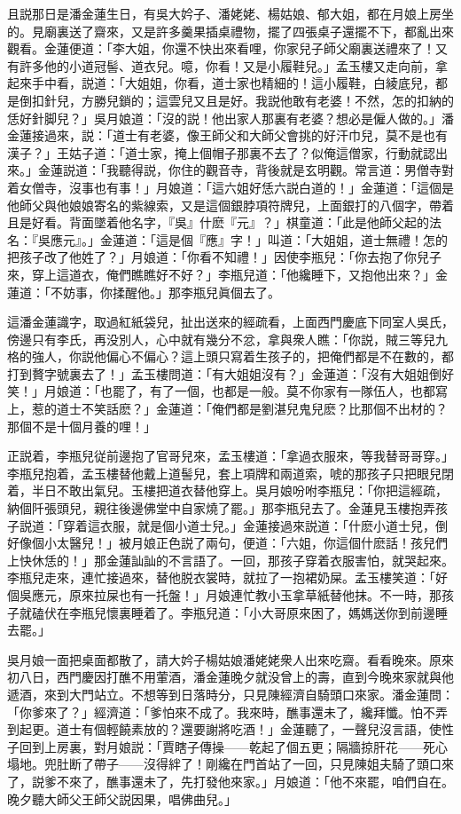 且説那日是潘金蓮生日，有吳大妗子、潘姥姥、楊姑娘、郁大姐，都在月娘上房坐的。見廟裏送了齋來，又是許多羹果插桌禮物，擺了四張桌子還擺不下，都亂出來觀看。金蓮便道：「李大姐，你還不快出來看哩，你家兒子師父廟裏送禮來了！又有許多他的小道冠髻、道衣兒。噫，你看！又是小履鞋兒。」孟玉樓又走向前，拿起來手中看，説道：「大姐姐，你看，道士家也精細的！這小履鞋，白綾底兒，都是倒扣針兒，方勝兒鎖的；這雲兒又且是好。我説他敢有老婆！不然，怎的扣納的恁好針脚兒？」吳月娘道：「沒的説！他出家人那裏有老婆？想必是僱人做的。」潘金蓮接過來，説：「道士有老婆，像王師父和大師父會挑的好汗巾兒，莫不是也有漢子？」王姑子道：「道士家，掩上個帽子那裏不去了？似俺這僧家，行動就認出來。」金蓮説道：「我聽得説，你住的觀音寺，背後就是玄明觀。常言道：男僧寺對着女僧寺，沒事也有事！」月娘道：「這六姐好恁六説白道的！」金蓮道：「這個是他師父與他娘娘寄名的紫線索，又是這個銀脖項符牌兒，上面銀打的八個字，帶着且是好看。背面墜着他名字，『吳』什麽『元』？」棋童道：「此是他師父起的法名：『吳應元』。」金蓮道：「這是個『應』字！」叫道：「大姐姐，道士無禮！怎的把孩子改了他姓了？」月娘道：「你看不知禮！」因使李瓶兒：「你去抱了你兒子來，穿上這道衣，俺們瞧瞧好不好？」李瓶兒道：「他纔睡下，又抱他出來？」金蓮道：「不妨事，你揉醒他。」那李瓶兒眞個去了。

這潘金蓮識字，取過紅紙袋兒，扯出送來的經疏看，上面西門慶底下同室人吳氏，傍邊只有李氏，再没別人，心中就有幾分不忿，拿與衆人瞧：「你説，賊三等兒九格的強人，你説他偏心不偏心？這上頭只寫着生孩子的，把俺們都是不在數的，都打到贅字號裏去了！」孟玉樓問道：「有大姐姐沒有？」金蓮道：「沒有大姐姐倒好笑！」月娘道：「也罷了，有了一個，也都是一般。莫不你家有一隊伍人，也都寫上，惹的道士不笑話麽？」金蓮道：「俺們都是劉湛兒鬼兒麽？比那個不出材的？那個不是十個月養的哩！」

正説着，李瓶兒従前邊抱了官哥兒來，孟玉樓道：「拿過衣服來，等我替哥哥穿。」李瓶兒抱着，孟玉樓替他戴上道髻兒，套上項牌和兩道索，唬的那孩子只把眼兒閉着，半日不敢出氣兒。玉樓把道衣替他穿上。吳月娘吩咐李瓶兒：「你把這經疏，納個阡張頭兒，親往後邊佛堂中自家燒了罷。」那李瓶兒去了。金蓮見玉樓抱弄孩子説道：「穿着這衣服，就是個小道士兒。」金蓮接過來説道：「什麽小道士兒，倒好像個小太醫兒！」被月娘正色説了兩句，便道：「六姐，你這個什麽話！孩兒們上快休恁的！」那金蓮訕訕的不言語了。一回，那孩子穿着衣服害怕，就哭起來。李瓶兒走來，連忙接過來，替他脱衣裳時，就拉了一抱裙奶屎。孟玉樓笑道：「好個吳應元，原來拉屎也有一托盤！」月娘連忙教小玉拿草紙替他抹。不一時，那孩子就磕伏在李瓶兒懷裏睡着了。李瓶兒道：「小大哥原來困了，媽媽送你到前邊睡去罷。」

吳月娘一面把桌面都散了，請大妗子楊姑娘潘姥姥衆人出來吃齋。看看晚來。原來初八日，西門慶因打醮不用葷酒，潘金蓮晚夕就没曾上的壽，直到今晚來家就與他遞酒，來到大門站立。不想等到日落時分，只見陳經濟自騎頭口來家。潘金蓮問：「你爹來了？」經濟道：「爹怕來不成了。我來時，醮事還未了，纔拜懺。怕不弄到起更。道士有個輕饒素放的？還要謝將吃酒！」金蓮聽了，一聲兒沒言語，使性子回到上房裏，對月娘説：「賈瞎子傳操——乾起了個五更；隔牆掠肝花——死心塌地。兜肚断了帶子——沒得絆了！剛纔在門首站了一回，只見陳姐夫騎了頭口來了，説爹不來了，醮事還未了，先打發他來家。」月娘道：「他不來罷，咱們自在。晚夕聽大師父王師父説因果，唱佛曲兒。」

